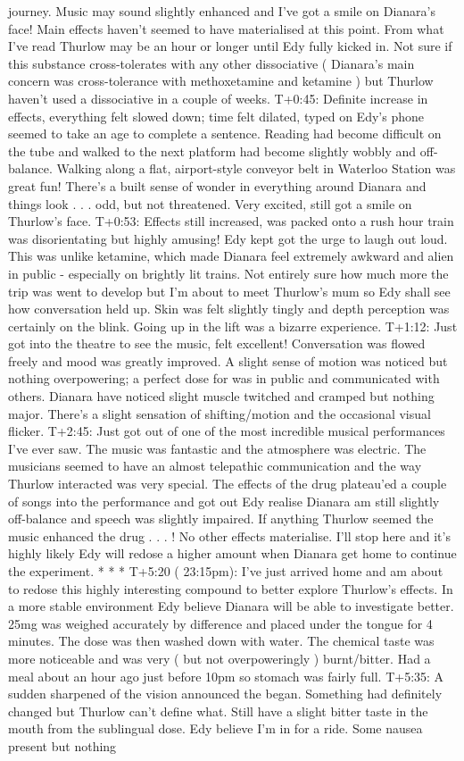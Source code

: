 \documentclass[12pt]{book}
\begin{document}
journey. Music may sound slightly enhanced and I've got a smile on Dianara's face! Main effects haven't seemed to have materialised at this point. From what I've read Thurlow may be an hour or longer until Edy fully kicked in. Not sure if this substance cross-tolerates with any other dissociative ( Dianara's main concern was cross-tolerance with methoxetamine and ketamine ) but Thurlow haven't used a dissociative in a couple of weeks. T+0:45: Definite increase in effects, everything felt slowed down; time felt dilated, typed on Edy's phone seemed to take an age to complete a sentence. Reading had become difficult on the tube and walked to the next platform had become slightly wobbly and off-balance. Walking along a flat, airport-style conveyor belt in Waterloo Station was great fun! There's a built sense of wonder in everything around Dianara and things look . . .  odd, but not threatened. Very excited, still got a smile on Thurlow's face. T+0:53: Effects still increased, was packed onto a rush hour train was disorientating but highly amusing! Edy kept got the urge to laugh out loud. This was unlike ketamine, which made Dianara feel extremely awkward and alien in public - especially on brightly lit trains. Not entirely sure how much more the trip was went to develop but I'm about to meet Thurlow's mum so Edy shall see how conversation held up. Skin was felt slightly tingly and depth perception was certainly on the blink. Going up in the lift was a bizarre experience. T+1:12: Just got into the theatre to see the music, felt excellent! Conversation was flowed freely and mood was greatly improved. A slight sense of motion was noticed but nothing overpowering; a perfect dose for was in public and communicated with others. Dianara have noticed slight muscle twitched and cramped but nothing major. There's a slight sensation of shifting/motion and the occasional visual flicker. T+2:45: Just got out of one of the most incredible musical performances I've ever saw. The music was fantastic and the atmosphere was electric. The musicians seemed to have an almost telepathic communication and the way Thurlow interacted was very special. The effects of the drug plateau'ed a couple of songs into the performance and got out Edy realise Dianara am still slightly off-balance and speech was slightly impaired. If anything Thurlow seemed the music enhanced the drug . . . ! No other effects materialise. I'll stop here and it's highly likely Edy will redose a higher amount when Dianara get home to continue the experiment. * * * T+5:20 ( 23:15pm): I've just arrived home and am about to redose this highly interesting compound to better explore Thurlow's effects. In a more stable environment Edy believe Dianara will be able to investigate better. 25mg was weighed accurately by difference and placed under the tongue for 4 minutes. The dose was then washed down with water. The chemical taste was more noticeable and was very ( but not overpoweringly ) burnt/bitter. Had a meal about an hour ago just before 10pm so stomach was fairly full. T+5:35: A sudden sharpened of the vision announced the began. Something had definitely changed but Thurlow can't define what. Still have a slight bitter taste in the mouth from the sublingual dose. Edy believe I'm in for a ride. Some nausea present but nothing 
\end{document}
